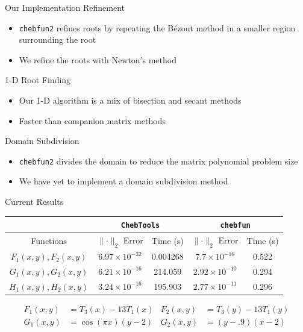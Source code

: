 \documentclass[final]{beamer}
\begin{document}
\begin{frame}{}
\begin{columns}[t]
\begin{column}{.31\linewidth}
\begin{block}{Our Implementation}
{\color{numhypRed} Refinement}\\
\begin{itemize}
\item {\tt chebfun2} refines roots by repeating the B\'{e}zout method in a smaller region surrounding the root \cite[Sec.\ 7]{nakatsukasa_2013}
\item We refine the roots with Newton's method
\end{itemize}
{\color{numhypRed} 1-D Root Finding}\\
\begin{itemize}
\item Our 1-D algorithm is a mix of bisection and secant methods
\item Faster than companion matrix methods \cite{boyd_2013}
\end{itemize}
{\color{numhypRed} Domain Subdivision}\\
\begin{itemize}
\item {\tt chebfun2} divides the domain to reduce the matrix polynomial problem size \cite[Sec.\ 4]{nakatsukasa_2013}
\item We have yet to implement a domain subdivision method
\end{itemize}
\end{block}
\begin{block}{Current Results}
\begin{center}
\begin{tabular}{ |c|c|c|c|c|  }
 \hline
 & \multicolumn{2}{|c|}{{\tt ChebTools}}&\multicolumn{2}{|c|}{{\tt chebfun}} \\
 \hline
 Functions							& $\lVert\cdot\rVert_2$ Error 	& Time (s)	& $\lVert\cdot\rVert_2$ Error	& Time (s)\\
 \hline
 $F_1(x,y),F_2(x,y)$ & $6.97\times10^{-32}$&0.004268 &$7.7\times10^{-16}$ &0.522 \\
 \hline
 $G_1(x,y),G_2(x,y)$ & $6.21\times10^{-16}$ & 214.059 &$2.92\times10^{-10}$ &0.294 \\
 \hline
 $H_1(x,y),H_2(x,y)$ &$3.24\times10^{-16}$ & 195.903 &$2.77\times10^{-11}$ &0.296 \\
 \hline
\end{tabular}
\end{center}
\begin{align*}
F_1(x,y) &= T_3(x)-13T_1(x) & F_2(x,y) &= T_3(y)-13T_1(y)\\
G_1(x,y) &= \cos(\pi x)(y-2) & G_2(x,y) &= (y-.9)(x-2)\\

\end{align*}
\end{block}
\end{column}
\end{columns}
\end{frame}
\end{document}
